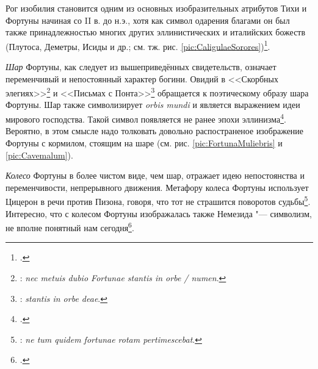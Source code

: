 Рог изобилия становится одним из основных изобразительных атрибутов Тихи и Фортуны начиная со II в. до н.э., хотя как символ одарения благами он был также принадлежностью многих других эллинистических и италийских божеств (Плутоса, Деметры, Исиды и др.; см. тж. рис. \ref{pic:CaligulaeSorores})\footcite[Pp. 77--78]{Arya2002}.




\textit{Шар} Фортуны, как следует из вышеприведённых свидетельств, означает переменчивый и непостоянный характер богини. Овидий в <<Скорбных элегиях>>\footnote{: \textit{nec metuis dubio Fortunae stantis in orbe / numen}.} и <<Письмах с Понта>>\footnote{: \textit{stantis in orbe deae}.} обращается к поэтическому образу шара Фортуны.
Шар также символизирует \textit{orbis mundi} и является выражением идеи мирового господства. Такой символ появляется не ранее эпохи эллинизма\footcite[Pp. 80--84]{Arya2002}. Вероятно, в этом смысле надо толковать довольно распостраненое изображение Фортуны с кормилом, стоящим на шаре (см. рис. \ref{pic:FortunaMuliebris} и \ref{pic:Cavemalum}).


\textit{Колесо} Фортуны в более чистом виде, чем шар, отражает идею непостоянства и переменчивости, непрерывного движения. Метафору колеса Фортуны использует Цицерон в речи против Пизона, говоря, что тот не страшится поворотов судьбы\footnote{: \textit{ne tum quidem fortunae rotam pertimescebat}.}. Интересно, что с колесом Фортуны изображалась также Немезида "--- символизм, не вполне понятный нам сегодня\footcite[P. 85]{Arya2002}.





